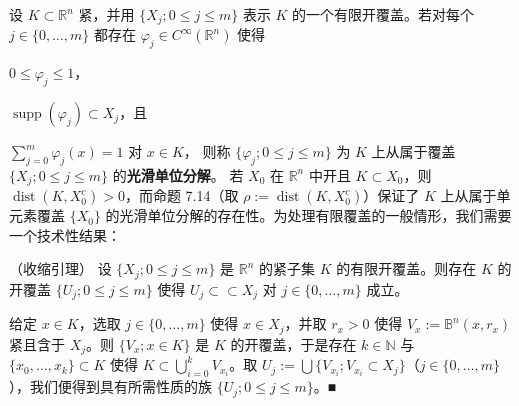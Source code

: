 设 $ K \subset \mathbb{R}^{n} $ 紧，并用 $ \{X_{j} ; 0 \le j \le m\} $ 表示 $ K $ 的一个有限开覆盖。若对每个 $ j \in \{0,\ldots,m\} $ 都存在 $ \varphi_{j} \in C^{\infty}(\mathbb{R}^{n}) $ 使得

\begin{subitems}
\item

$ 0 \le \varphi_{j} \le 1 $，

\item

$ \operatorname{supp}(\varphi_{j}) \subset X_{j} $，且

\item

$ \sum_{j=0}^{m}\varphi_{j}(x) = 1 $ 对 $ x \in K $，
则称 $ \{\varphi_{j} ; 0 \le j \le m\} $ 为 $ K $ 上从属于覆盖 $ \{X_{j} ; 0 \le j \le m\} $ 的\textbf{光滑单位分解}。
若 $ X_{0} $ 在 $ \mathbb{R}^{n} $ 中开且 $ K \subset X_{0} $，则 $ \operatorname{dist}(K,X_{0}^{c}) > 0 $，而命题 7.14（取 $ \rho := \operatorname{dist}(K,X_{0}^{c}) $）保证了 $ K $ 上从属于单元素覆盖 $ \{X_{0}\} $ 的光滑单位分解的存在性。为处理有限覆盖的一般情形，我们需要一个技术性结果：

\end{subitems}

\begin{lemma}

（收缩引理） 设 $ \{X_{j} ; 0 \le j \le m\} $ 是 $ \mathbb{R}^{n} $ 的紧子集 $ K $ 的有限开覆盖。则存在 $ K $ 的开覆盖 $ \{U_{j} ; 0 \le j \le m\} $ 使得 $ U_{j} \subset\subset X_{j} $ 对 $ j \in \{0,\ldots,m\} $ 成立。

\proofhead
给定 $ x \in K $，选取 $ j \in \{0,\ldots,m\} $ 使得 $ x \in X_{j} $，并取 $ r_{x} > 0 $ 使得 $ V_{x} := \mathbb{B}^{n}(x,r_{x}) $ 紧且含于 $ X_{j} $。则 $ \{V_{x} ; x \in K\} $ 是 $ K $ 的开覆盖，于是存在 $ k \in \mathbb{N} $ 与 $ \{x_{0},\ldots,x_{k}\} \subset K $ 使得 $ K \subset \bigcup_{i=0}^{k}V_{x_{i}} $。取 $ U_{j} := \bigcup\{V_{x_{i}} ; V_{x_{i}} \subset X_{j}\} $（$ j \in \{0,\ldots,m\} $），我们便得到具有所需性质的族 $ \{U_{j} ; 0 \le j \le m\} $。\nobreak\hspace{0.35em}■
\end{lemma}


